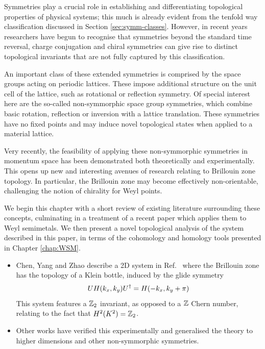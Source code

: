 
Symmetries play a crucial role in establishing and differentiating topological properties of physical systems; this much is already evident from the tenfold way classification discussed in Section \ref{sec:symm-classes}. However, in recent years researchers have begun to recognise that symmetries beyond the standard time reversal, charge conjugation and chiral symmetries can give rise to distinct topological invariants that are not fully captured by this classification.

An important class of these extended symmetries is comprised by the space groups acting on periodic lattices. These impose additional structure on the unit cell of the lattice, such as rotational or reflection symmetry. Of special interest here are the so-called non-symmorphic space group symmetries, which combine basic rotation, reflection or inversion with a lattice translation. These symmetries have no fixed points and may induce novel topological states when applied to a material lattice.

Very recently, the feasibility of applying these non-symmorphic symmetries in momentum space has been demonstrated both theoretically and experimentally. This opens up new and interesting avenues of research relating to Brillouin zone topology. In particular, the Brillouin zone may become effectively non-orientable, challenging the notion of chirality for Weyl points.

We begin this chapter with a short review of existing literature surrounding these concepts, culminating in a treatment of a recent paper which applies them to Weyl semimetals. We then present a novel topological analysis of the system described in this paper, in terms of the cohomology and homology tools presented in Chapter \ref{chap:WSM}.


{\color{blue}
\begin{itemize}
	\item Chen, Yang and Zhao describe a 2D system in Ref.\ \cite{CYZ_Klein-gauge} where the Brillouin zone has the topology of a Klein bottle, induced by the glide symmetry
	\begin{equation}\label{eq:2D_glide}
		UH(k_x, k_y)U^\dag = H(-k_x, k_y + \pi)
	\end{equation}
	This system features a $\mathbb{Z}_2$ invariant, as opposed to a $\mathbb{Z}$ Chern number, relating to the fact that $H^2(K^2) = \mathbb{Z}_2$.
	
	\item Other works have verified this experimentally and generalised the theory to higher dimensions and other non-symmorphic symmetries.
\end{itemize}
}

